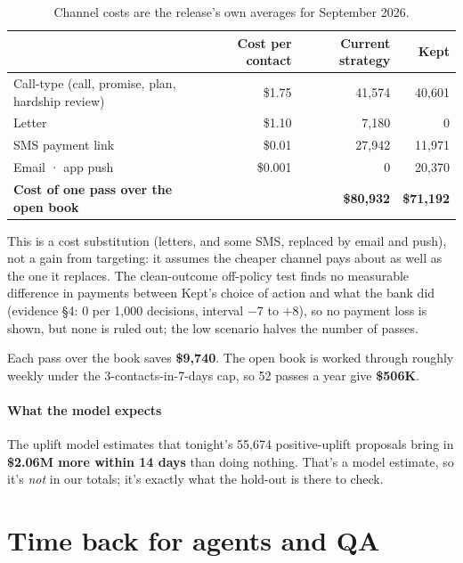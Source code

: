\documentclass[11pt]{article}
\begin{document}
\begin{table}[htbp]\small\centering
\begin{tabular}{@{}lrrr@{}}
\toprule
& \textbf{Cost per contact} & \textbf{Current strategy} & \textbf{Kept} \\
\midrule
Call-type (call, promise, plan, hardship review) & \$1.75 & 41,574 & 40,601 \\
Letter & \$1.10 & 7,180 & 0 \\
SMS payment link & \$0.01 & 27,942 & 11,971 \\
Email · app push & \$0.001 & 0 & 20,370 \\
\midrule
\textbf{Cost of one pass over the open book} & & \textbf{\$80,932} & \textbf{\$71,192} \\
\bottomrule
\end{tabular}
\caption{Channel costs are the release's own averages for September 2026.}
\end{table}

This is a cost substitution (letters, and some SMS, replaced by email and push), not a gain from targeting: it assumes the cheaper channel pays about as well as the one it replaces. The clean-outcome off-policy test finds no measurable difference in payments between Kept's choice of action and what the bank did (evidence §4: 0 per 1,000 decisions, interval $-$7 to $+$8), so no payment loss is shown, but none is ruled out; the low scenario halves the number of passes.

Each pass over the book saves \textbf{\$9,740}. The open book is worked through roughly weekly under the
3-contacts-in-7-days cap, so 52 passes a year give \textbf{\$506K}.

\paragraph{What the model expects} The uplift model estimates that tonight's 55,674 positive-uplift proposals bring in
\textbf{\$2.06M more within 14 days} than doing nothing. That's a model estimate, so it's \emph{not} in our totals; it's
exactly what the hold-out is there to check.

\section{Time back for agents and QA}
\end{document}
